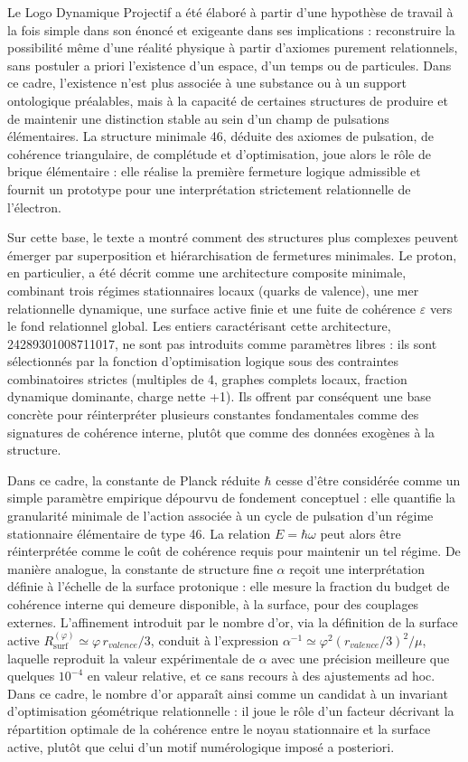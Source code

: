 \documentclass[11pt,a4paper]{article}
\begin{document}
Le Logo Dynamique Projectif a été élaboré à partir d’une hypothèse de travail à la fois simple dans son énoncé et exigeante dans ses implications : reconstruire la possibilité même d’une réalité physique à partir d’axiomes purement relationnels, sans postuler a priori l’existence d’un espace, d’un temps ou de particules. Dans ce cadre, l’existence n’est plus associée à une substance ou à un support ontologique préalables, mais à la capacité de certaines structures de produire et de maintenir une distinction stable au sein d’un champ de pulsations élémentaires. La structure minimale 46, déduite des axiomes de pulsation, de cohérence triangulaire, de complétude et d’optimisation, joue alors le rôle de brique élémentaire : elle réalise la première fermeture logique admissible et fournit un prototype pour une interprétation strictement relationnelle de l’électron.

Sur cette base, le texte a montré comment des structures plus complexes peuvent émerger par superposition et hiérarchisation de fermetures minimales. Le proton, en particulier, a été décrit comme une architecture composite minimale, combinant trois régimes stationnaires locaux (quarks de valence), une mer relationnelle dynamique, une surface active finie et une fuite de cohérence \(\varepsilon\) vers le fond relationnel global. Les entiers caractérisant cette architecture, 24289301008711017, ne sont pas introduits comme paramètres libres : ils sont sélectionnés par la fonction d’optimisation logique sous des contraintes combinatoires strictes (multiples de 4, graphes complets locaux, fraction dynamique dominante, charge nette +1). Ils offrent par conséquent une base concrète pour réinterpréter plusieurs constantes fondamentales comme des signatures de cohérence interne, plutôt que comme des données exogènes à la structure.

Dans ce cadre, la constante de Planck réduite \(\hbar\) cesse d’être considérée comme un simple paramètre empirique dépourvu de fondement conceptuel : elle quantifie la granularité minimale de l’action associée à un cycle de pulsation d’un régime stationnaire élémentaire de type 46. La relation \(E=\hbar\omega\) peut alors être réinterprétée comme le coût de cohérence requis pour maintenir un tel régime. De manière analogue, la constante de structure fine \(\alpha\) reçoit une interprétation définie à l’échelle de la surface protonique : elle mesure la fraction du budget de cohérence interne qui demeure disponible, à la surface, pour des couplages externes. L’affinement introduit par le nombre d’or, via la définition de la surface active \(R_{\operatorname{surf}}^{\left(\varphi\right)} \simeq \varphi \, r_{valence}/3\), conduit à l’expression \(\alpha^{-1} \simeq \varphi^{2}(r_{valence}/3)^{2}/\mu\), laquelle reproduit la valeur expérimentale de \(\alpha\) avec une précision meilleure que quelques \(10^{-4}\) en valeur relative, et ce sans recours à des ajustements ad hoc. Dans ce cadre, le nombre d’or apparaît ainsi comme un candidat à un invariant d’optimisation géométrique relationnelle : il joue le rôle d’un facteur décrivant la répartition optimale de la cohérence entre le noyau stationnaire et la surface active, plutôt que celui d’un motif numérologique imposé a posteriori.
\end{document}
